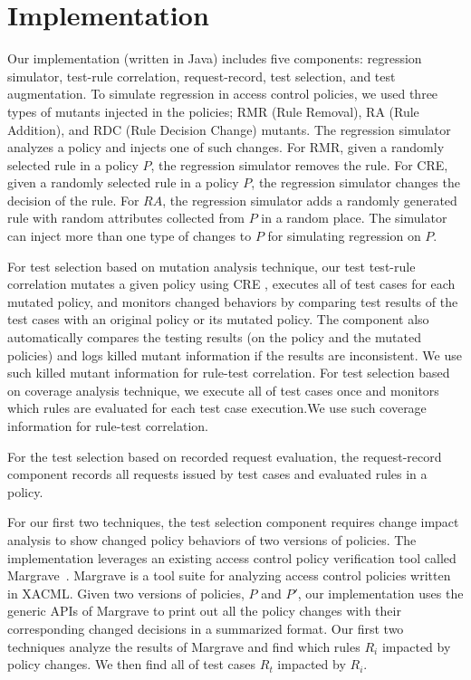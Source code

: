 \section{Implementation} \label{sec:implementation}

Our implementation (written in Java) includes five components: regression simulator, test-rule correlation, request-record, test selection,
and test augmentation. To simulate regression in access control policies, 
we used three types of mutants injected in the policies; RMR (Rule Removal), RA (Rule Addition), and RDC (Rule Decision Change)
mutants. The regression simulator analyzes a policy and injects one
of such changes. For RMR, given a randomly selected rule in a policy $P$,
the regression simulator removes the rule. For CRE,
given a randomly selected rule in a policy $P$, the regression simulator changes
the decision of the rule.
For $RA$, the regression simulator adds a randomly generated
rule with random attributes collected from $P$ in a random place.
The simulator can inject more than one type of changes to $P$ for simulating
regression on $P$.

For test selection based on mutation analysis technique,
our test test-rule correlation mutates a given policy using CRE
, executes all of test cases for each mutated policy, and monitors changed
behaviors by comparing test results of the test cases with an original policy or its mutated policy.
The component also automatically compares the testing results (on the policy and the mutated
policies) and logs killed mutant information if the results are inconsistent. We use
such killed mutant information for rule-test correlation.
For test selection based on coverage analysis technique,
we execute  all of test cases once and monitors
which rules are evaluated for each test case execution.We use such
coverage information for rule-test correlation.

For the test selection based on recorded request evaluation,
the request-record component records all requests issued by test cases and evaluated rules in a policy.

For our first two techniques, the test selection component requires change impact analysis to
show changed policy behaviors of two versions of policies.
The implementation leverages an existing access control policy verification tool called Margrave~\cite{fisler05:verification}. 
Margrave is a tool suite for analyzing access control policies written in XACML.
Given two versions of policies, $P$ and $P'$, 
our implementation uses the generic APIs of Margrave to
print out all the policy changes with their corresponding changed decisions in a summarized format.
Our first two techniques analyze the results of Margrave and
find which rules $R_i$ impacted by policy changes. We then find all of test cases $R_t$
impacted by $R_i$.

